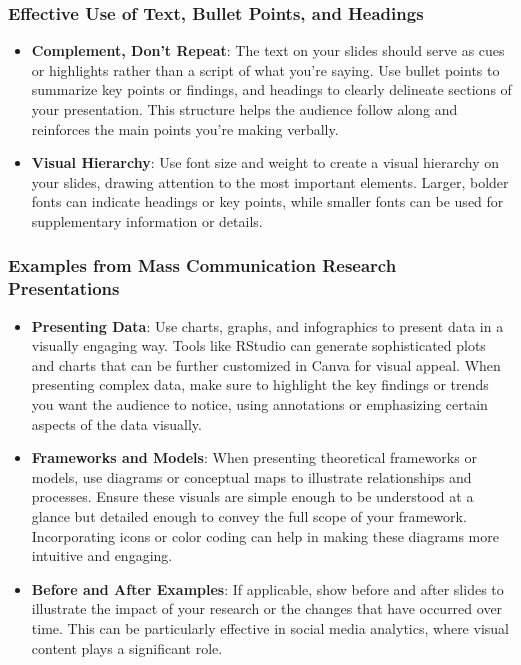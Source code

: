 \documentclass[
]{book}
\begin{document}
\hypertarget{effective-use-of-text-bullet-points-and-headings}{%
\subsubsection{Effective Use of Text, Bullet Points, and Headings}\label{effective-use-of-text-bullet-points-and-headings}}

\begin{itemize}
\item
  \textbf{Complement, Don't Repeat}: The text on your slides should serve as cues or highlights rather than a script of what you're saying. Use bullet points to summarize key points or findings, and headings to clearly delineate sections of your presentation. This structure helps the audience follow along and reinforces the main points you're making verbally.
\item
  \textbf{Visual Hierarchy}: Use font size and weight to create a visual hierarchy on your slides, drawing attention to the most important elements. Larger, bolder fonts can indicate headings or key points, while smaller fonts can be used for supplementary information or details.
\end{itemize}

\hypertarget{examples-from-mass-communication-research-presentations}{%
\subsubsection{Examples from Mass Communication Research Presentations}\label{examples-from-mass-communication-research-presentations}}

\begin{itemize}
\item
  \textbf{Presenting Data}: Use charts, graphs, and infographics to present data in a visually engaging way. Tools like RStudio can generate sophisticated plots and charts that can be further customized in Canva for visual appeal. When presenting complex data, make sure to highlight the key findings or trends you want the audience to notice, using annotations or emphasizing certain aspects of the data visually.
\item
  \textbf{Frameworks and Models}: When presenting theoretical frameworks or models, use diagrams or conceptual maps to illustrate relationships and processes. Ensure these visuals are simple enough to be understood at a glance but detailed enough to convey the full scope of your framework. Incorporating icons or color coding can help in making these diagrams more intuitive and engaging.
\item
  \textbf{Before and After Examples}: If applicable, show before and after slides to illustrate the impact of your research or the changes that have occurred over time. This can be particularly effective in social media analytics, where visual content plays a significant role.
\end{itemize}
\end{document}
